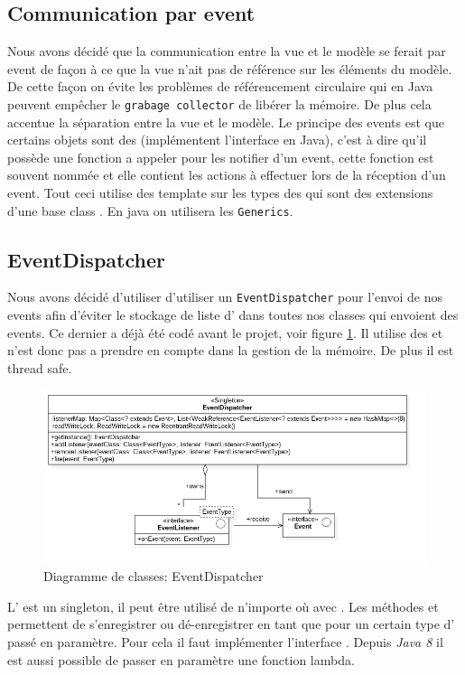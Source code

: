 \documentclass[report, backcover, french, nodocumentinfo]{upmethodology-document}
\begin{document}
			\subsection{Communication par event}
					Nous avons décidé que la communication entre la vue et le modèle se ferait par event de façon à ce que la vue n'ait pas de référence sur les éléments du modèle. De cette façon on évite les problèmes de référencement circulaire qui en Java peuvent empêcher le \texttt{grabage collector} de libérer la mémoire. De plus cela accentue la séparation entre la vue et le modèle.
					Le principe des events est que certains objets sont des  (implémentent l'interface en Java), c'est à dire qu'il possède une fonction a appeler pour les notifier d'un event, cette fonction est souvent nommée  et elle contient les actions à effectuer lors de la réception d'un event. Tout ceci utilise des template sur les types des  qui sont des extensions d'une base class . En java on utilisera les \texttt{Generics}.
			\subsection{EventDispatcher}
				\p{}
					Nous avons décidé d'utiliser d'utiliser un \texttt{EventDispatcher} pour l'envoi de nos events afin d'éviter le stockage de liste d' dans toutes nos classes qui envoient des events. Ce dernier a déjà été codé avant le projet, voir figure \ref{fig:EventDispatcherClassDiagram}. Il utilise des  et n'est donc pas a prendre en compte dans la gestion de la mémoire. De plus il est thread safe.
					\begin{figure}[h!]
						\centering
						\includegraphics[width=\textwidth]{figures/EventDispatcherClassDiagram}
						\caption{Diagramme de classes: EventDispatcher}
						\label{fig:EventDispatcherClassDiagram}
					\end{figure}
					L' est un singleton, il peut être utilisé de n'importe où avec . Les méthodes  et  permettent de s'enregistrer ou dé-enregistrer en tant que  pour un certain type d' passé en paramètre. Pour cela il faut implémenter l'interface . Depuis \textit{Java 8} il est aussi possible de passer en paramètre une fonction lambda.
\end{document}
